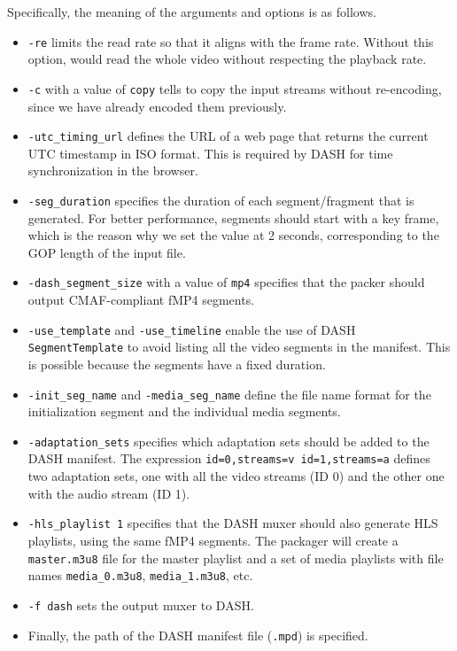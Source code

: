 Specifically, the meaning of the arguments and options is as follows.

\begin{itemize}
    \item \texttt{-re} limits the read rate so that it aligns with the frame rate. Without this option, \ffmpeg{} would read the whole video without respecting the playback rate.
    \item \texttt{-c} with a value of \texttt{copy} tells \ffmpeg{} to copy the input streams without re-encoding, since we have already encoded them previously.
    \item \texttt{-utc\_timing\_url} defines the URL of a web page that returns the current UTC timestamp in ISO format. This is required by DASH for time synchronization in the browser.
    \item \texttt{-seg\_duration} specifies the duration of each segment/fragment that is generated. For better performance, segments should start with a key frame, which is the reason why we set the value at 2 seconds, corresponding to the GOP length of the input file.
    \item \texttt{-dash\_segment\_size} with a value of \texttt{mp4} specifies that the packer should output CMAF-compliant fMP4 segments.
    \item \texttt{-use\_template} and \texttt{-use\_timeline} enable the use of DASH \texttt{SegmentTemplate} to avoid listing all the video segments in the manifest. This is possible because the segments have a fixed duration.
    \item \texttt{-init\_seg\_name} and \texttt{-media\_seg\_name} define the file name format for the initialization segment and the individual media segments.
    \item \texttt{-adaptation\_sets} specifies which adaptation sets should be added to the DASH manifest. The expression \texttt{id=0,streams=v id=1,streams=a} defines two adaptation sets, one with all the video streams (ID 0) and the other one 
    with the audio stream (ID 1).
    \item \texttt{-hls\_playlist 1} specifies that the DASH muxer should also generate HLS playlists, using the same fMP4 segments. The packager will create a \texttt{master.m3u8} file for the master playlist and a set of media playlists with file names \texttt{media\_0.m3u8}, \texttt{media\_1.m3u8}, etc.
    \item \texttt{-f dash} sets the \ffmpeg{} output muxer to DASH.
    \item Finally, the path of the DASH manifest file (\texttt{.mpd}) is specified.
\end{itemize}

